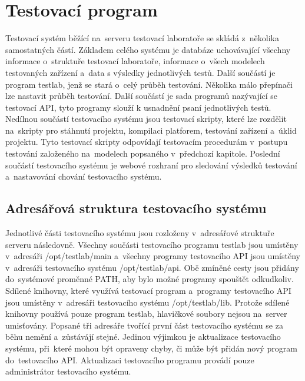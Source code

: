 \chapter{Testovací program}
Testovací systém běžící na~serveru testovací laboratoře se skládá z~několika samostatných částí. Základem celého systému je databáze uchovávající všechny informace o~struktuře testovací laboratoře, informace o~všech modelech testovaných zařízení a~data s výsledky jednotlivých testů. Další součástí je program testlab, jenž se stará o~celý průběh testování. Několika málo přepínači lze nastavit průběh testování. Další součástí je sada programů nazývající se testovací API, tyto programy slouží k usnadnění psaní jednotlivých testů. Nedílnou součástí testovacího systému jsou testovací skripty, které lze rozdělit na~skripty pro stáhnutí projektu, kompilaci platforem, testování zařízení a~úklid projektu. Tyto testovací skripty odpovídají testovacím procedurám v~postupu testování založeného na~modelech popsaného v~předchozí kapitole. Poslední součástí testovacího systému je webové rozhraní pro sledování výsledků testování a~nastavování chování testovacího systému.

\section{Adresářová struktura testovacího systému}

Jednotlivé části testovacího systému jsou rozloženy v~adresářové struktuře serveru následovně. Všechny součásti testovacího programu testlab jsou umístěny v~adresáři /opt/testlab/main a~všechny programy testovacího API jsou umístěny v~adresáři
testovacího systému /opt/testlab/api. Obě zmíněné cesty jsou přidány do~systémové proměnné PATH, aby bylo možné programy spouštět odkudkoliv. Sdílené knihovny, které využívá testovací program a~programy testovacího API jsou umístěny v~adresáři testovacího systému /opt/testlab/lib. Protože sdílené knihovny používá pouze program testlab, hlavičkové soubory nejsou na~server umisťovány. Popsané tři adresáře tvořící první část testovacího systému se za běhu nemění a~zůstávájí stejné. Jedinou výjimkou je aktualizace testovacího systému, při~které mohou být opraveny chyby, či může být přidán nový program do~testovacího API. Aktualizaci testovacího programu provádí pouze administrátor testovacího systému.

